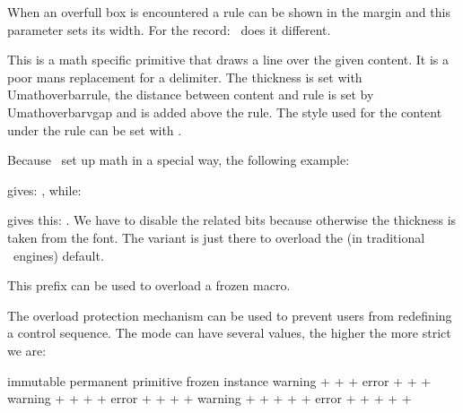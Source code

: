 \startoldprimitive[title={\prm {overfullrule}}]

When an overfull box is encountered a rule can be shown in the margin and this
parameter sets its width. For the record: \CONTEXT\ does it different.

\stopoldprimitive

\startoldprimitive[title={\prm {overline}}]

This is a math specific primitive that draws a line over the given content. It is
a poor mans replacement for a delimiter. The thickness is set with \prm
{Umathoverbarrule}, the distance between content and rule is set by \prm
{Umathoverbarvgap} and  is added above the rule. The style
used for the content under the rule can be set with .

Because \CONTEXT\ set up math in a special way, the following example:

\startbuffer[demo]
\stopbuffer

\typebuffer[demo]

gives: , while:

\startbuffer[setup]
\mathfontcontrol\zerocount
\Umathoverbarkern{}
\Umathoverbarvgap{}
\Umathoverbarrule{}
\Umathoverlinevariant\textstyle\scriptstyle
\stopbuffer

\typebuffer[setup]

gives this: . We have to disable the related
 bits because otherwise the thickness is taken from the font. The
variant is just there to overload the (in traditional \TEX\ engines) default.

\stopoldprimitive

\startnewprimitive[title={\prm {overloaded}}]

This prefix can be used to overload a frozen macro.

\stopnewprimitive

\startnewprimitive[title={\prm {overloadmode}}]

The overload protection mechanism can be used to prevent users from redefining
a control sequence. The mode can have several values, the higher the more strict
we are:

\starttabulate[||||||||]
    \NC   \NC         \NC immutable \NC permanent \NC primitive \NC frozen \NC instance \NC \NR
     \NC warning \NC +         \NC +         \NC +         \NC        \NC          \NC \NR
     \NC error   \NC +         \NC +         \NC +         \NC        \NC          \NC \NR
     \NC warning \NC +         \NC +         \NC +         \NC +      \NC          \NC \NR
     \NC error   \NC +         \NC +         \NC +         \NC +      \NC          \NC \NR
     \NC warning \NC +         \NC +         \NC +         \NC +      \NC +        \NC \NR
     \NC error   \NC +         \NC +         \NC +         \NC +      \NC +        \NC \NR
\stoptabulate

